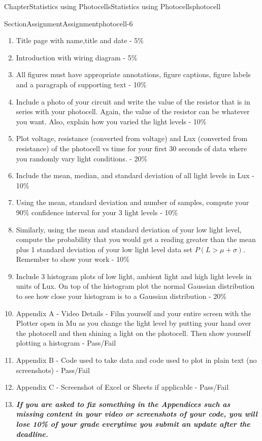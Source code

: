 \documentclass[oneside,10pt,]{book}
\newcommand{\alert}[1]{\textbf{\textit{#1}}}
\numberwithin{equation}{section}
\begin{document}
\begin{chapterptx}{Chapter}{Statistics using Photocells}{}{Statistics using Photocells}{}{}{photocell}
\begin{sectionptx}{Section}{Assignment}{}{Assignment}{}{}{photocell-6}
\begin{introduction}{}
%
\begin{enumerate}
\item{}Title page with name,title and date - 5\%%
\item{}Introduction with wiring diagram - 5\%%
\item{}All figures must have appropriate annotations, figure captions, figure labels and a paragraph of supporting text - 10\%%
\item{}Include a photo of your circuit and write the value of the resistor that is in series with your photocell. Again, the value of the resistor can be whatever you want. Also, explain how you varied the light levels - 10\%%
\item{}Plot voltage, resistance (converted from voltage) and Lux (converted from resistance) of the photocell vs time for your first 30 seconds of data where you randomly vary light conditions. - 20\%%
\item{}Include the mean, median, and standard deviation of all light levels in Lux - 10\%%
\item{}Using the mean, standard deviation and number of samples, compute your 90\% confidence interval for your 3 light levels - 10\%%
\item{}Similarly, using the mean and standard deviation of your low light level, compute the probability that you would get a reading greater than the mean plus 1 standard deviation of your low light level data set \(P(L>\mu+\sigma)\). Remember to show your work - 10\%%
\item{}Include 3 histogram plots of low light, ambient light and high light levels in units of Lux. On top of the histogram plot the normal Gaussian distribution to see how close your histogram is to a Gaussian distribution - 20\%%
\item{}Appendix A - Video Details - Film yourself and your entire screen with the Plotter open in Mu as you change the light level by putting your hand over the photocell and then shining a light on the photocell. Then show yourself plotting a histogram - Pass\slash{}Fail%
\item{}Appendix B - Code used to take data and code used to plot in plain text (no screenshots) - Pass\slash{}Fail%
\item{}Appendix C - Screenshot of Excel or Sheets if applicable - Pass\slash{}Fail%
\item{}\alert{If you are asked to fix something in the Appendices such as missing content in your video or screenshots of your code, you will lose 10\% of your grade everytime you submit an update after the deadline.}%
\end{enumerate}
\end{introduction}%
\end{sectionptx}
\end{chapterptx}
\end{document}
